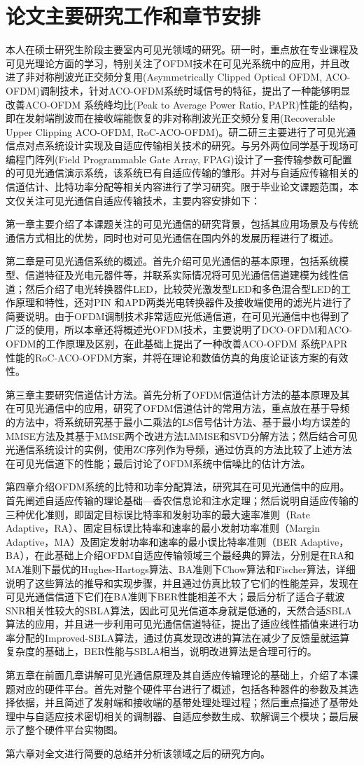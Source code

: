 \section{论文主要研究工作和章节安排}\label{sec:concept}
本人在硕士研究生阶段主要室内可见光领域的研究。研一时，重点放在专业课程及可见光理论方面的学习，特别关注了OFDM技术在可见光系统中的应用，并且改进了非对称削波光正交频分复用(Asymmetrically Clipped Optical OFDM, ACO-OFDM)调制技术，针对ACO-OFDM系统时域信号的特征，提出了一种能够明显改善ACO-OFDM 系统峰均比(Peak to Average Power Ratio, PAPR)性能的结构，即在发射端削波而在接收端能恢复的非对称削波光正交频分复用(Recoverable Upper Clipping ACO-OFDM, RoC-ACO-OFDM)\cite{xu2014aco}。研二研三主要进行了可见光通信点对点系统设计实现及自适应传输相关技术的研究。与另外两位同学基于现场可编程门阵列(Field Programmable Gate Array, FPAG)设计了一套传输参数可配置的可见光通信演示系统，该系统已有自适应传输的雏形。并对与自适应传输相关的信道估计、比特功率分配等相关内容进行了学习研究。限于毕业论文课题范围，本文仅关注可见光通信自适应传输技术，主要内容安排如下：

第一章主要介绍了本课题关注的可见光通信的研究背景，包括其应用场景及与传统通信方式相比的优势，同时也对可见光通信在国内外的发展历程进行了概述。

第二章是可见光通信系统的概述。首先介绍可见光通信的基本原理，包括系统模型、信道特征及光电元器件等，并联系实际情况将可见光通信信道建模为线性信道；然后介绍了电光转换器件LED，比较荧光激发型LED和多色混合型LED的工作原理和特性，还对PIN 和APD两类光电转换器件及接收端使用的滤光片进行了简要说明。由于OFDM调制技术非常适应光低通信道，在可见光通信中也得到了广泛的使用，所以本章还将概述光OFDM技术，主要说明了DCO-OFDM和ACO-OFDM的工作原理及区别，在此基础上提出了一种改善ACO-OFDM 系统PAPR 性能的RoC-ACO-OFDM方案，并将在理论和数值仿真的角度论证该方案的有效性。

第三章主要研究信道估计方法。首先分析了OFDM信道估计方法的基本原理及其在可见光通信中的应用，研究了OFDM信道估计的常用方法，重点放在基于导频的方法中，将系统研究基于最小二乘法的LS信号估计方法、基于最小均方误差的MMSE方法及其基于MMSE两个改进方法LMMSE和SVD分解方法；然后结合可见光通信系统设计的实例，使用ZC序列作为导频，通过仿真的方法比较了上述方法在可见光信道下的性能；最后讨论了OFDM系统中信噪比的估计方法。

第四章介绍OFDM系统的比特和功率分配算法，研究其在可见光通信中的应用。首先阐述自适应传输的理论基础—香农信息论和注水定理；然后说明自适应传输的三种优化准则，即固定目标误比特率和发射功率的最大速率准则（Rate Adaptive，RA）、固定目标误比特率和速率的最小发射功率准则（Margin Adaptive，MA）及固定发射功率和速率的最小误比特率准则（BER Adaptive，BA），在此基础上介绍OFDM自适应传输领域三个最经典的算法，分别是在RA和MA准则下最优的Hughes-Hartogs算法、BA准则下Chow算法和Fischer算法，详细说明了这些算法的推导和实现步骤，并且通过仿真比较了它们的性能差异，发现在可见光通信信道下它们在BA准则下BER性能相差不大；最后分析了适合子载波SNR相关性较大的SBLA算法，因此可见光信道本身就是低通的，天然合适SBLA算法的应用，并且进一步利用可见光通信信道特征，提出了适应线性插值来进行功率分配的Improved-SBLA算法，通过仿真发现改进的算法在减少了反馈量就运算复杂度的基础上，BER性能与SBLA相当，说明改进算法是合理可行的。

第五章在前面几章讲解可见光通信原理及其自适应传输理论的基础上，介绍了本课题对应的硬件平台。首先对整个硬件平台进行了概述，包括各种器件的参数及其选择依据，并且简述了发射端和接收端的基带处理处理过程；然后重点描述了基带处理中与自适应技术密切相关的调制器、自适应参数生成、软解调三个模块；最后展示了整个硬件平台实物图。

第六章对全文进行简要的总结并分析该领域之后的研究方向。